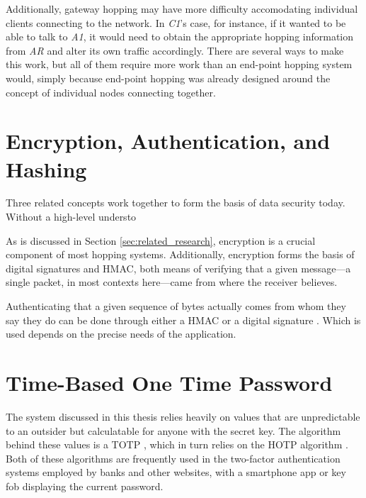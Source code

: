 \par Additionally, gateway hopping may have more difficulty accomodating individual clients connecting to the network. In \textit{C1}'s case, for instance, if it wanted to be able to talk to \textit{A1}, it would need to obtain the appropriate hopping information from \textit{AR} and alter its own traffic accordingly. There are several ways to make this work, but all of them require more work than an end-point hopping system would, simply because end-point hopping was already designed around the concept of individual nodes connecting together.

\section{Encryption, Authentication, and Hashing}
\label{sec:encryption}
\par Three related concepts work together to form the basis of data security today. Without a high-level understo

As is discussed in Section \ref{sec:related_research}, encryption is a crucial component of most hopping systems. Additionally, encryption forms the basis of digital signatures and \ac{HMAC}, both means of verifying that a given message---a single packet, in most contexts here---came from where the receiver believes. 

\par Authenticating that a given sequence of bytes actually comes from whom they say they do can be done through either a \ac{HMAC} \cite{rfc2104} or a digital signature \cite{rfc3447}. Which is used depends on the precise needs of the application.

\par {}

\section{Time-Based One Time Password}
\label{sec:totp}
\par The system discussed in this thesis relies heavily on values that are unpredictable to an outsider but calculatable for anyone with the secret key. The algorithm behind these values is a \ac{TOTP} \cite{rfc6238}, which in turn relies on the \ac{HOTP} algorithm \cite{rfc4226}. Both of these algorithms are frequently used in the two-factor authentication systems employed by banks and other websites, with a smartphone app or key fob displaying the current password.

